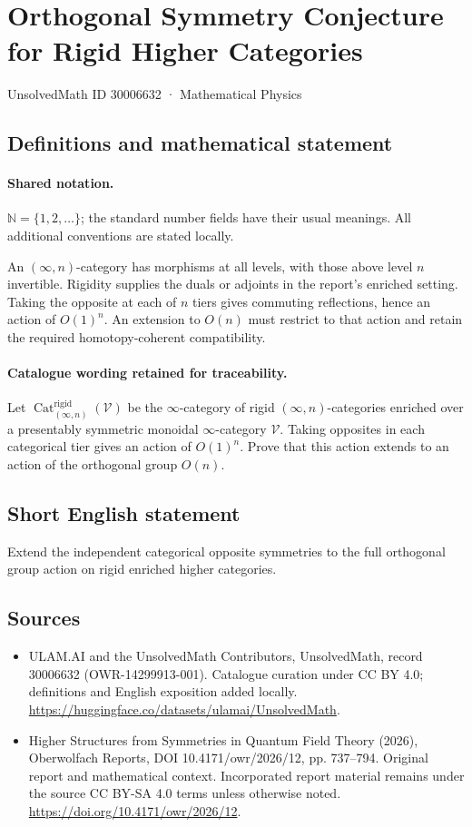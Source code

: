\documentclass[11pt]{article}
\begin{document}
\setcounter{section}{30006631}
\section{Orthogonal Symmetry Conjecture for Rigid Higher Categories}\label{30006632}
{\small UnsolvedMath ID 30006632 · Mathematical Physics}
\subsection{Definitions and mathematical statement}

\paragraph{Shared notation.}$\mathbb N=\{1,2,\ldots\}$; the standard number fields have their usual meanings. All additional conventions are stated locally.


An $(\infty,n)$-category has morphisms at all levels, with those above level $n$ invertible. Rigidity supplies the duals or adjoints in the report's enriched setting. Taking the opposite at each of $n$ tiers gives commuting reflections, hence an action of $O(1)^n$. An extension to $O(n)$ must restrict to that action and retain the required homotopy-coherent compatibility.

\paragraph{Catalogue wording retained for traceability.}
Let $\operatorname{Cat}^{\mathrm{rigid}}_{(\infty,n)}(\mathcal{V})$ be the $\infty$-category of rigid $(\infty,n)$-categories enriched over a presentably symmetric monoidal $\infty$-category $\mathcal{V}$. Taking opposites in each categorical tier gives an action of $O(1)^n$. Prove that this action extends to an action of the orthogonal group $O(n)$.
\subsection{Short English statement}
Extend the independent categorical opposite symmetries to the full orthogonal group action on rigid enriched higher categories.
\subsection{Sources}
\begin{itemize}
\item[\hypertarget{source:30006632:1}{S1}] ULAM.AI and the UnsolvedMath Contributors, UnsolvedMath, record 30006632 (OWR-14299913-001). Catalogue curation under CC BY 4.0; definitions and English exposition added locally.
\url{https://huggingface.co/datasets/ulamai/UnsolvedMath}.
\item[\hypertarget{source:30006632:2}{S2}] Higher Structures from Symmetries in Quantum Field Theory (2026), Oberwolfach Reports, DOI 10.4171/owr/2026/12, pp. 737--794. Original report and mathematical context. Incorporated report material remains under the source CC BY-SA 4.0 terms unless otherwise noted.
\url{https://doi.org/10.4171/owr/2026/12}.
\end{itemize}
\label{end:30006632}
\end{document}
